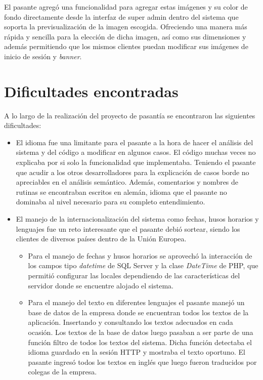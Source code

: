 	El pasante agregó una funcionalidad para agregar estas imágenes y su color de fondo directamente desde la interfaz de super admin dentro del sistema que soporta la previsualización de la imagen escogida. Ofreciendo una manera más rápida y sencilla para la elección de dicha imagen, así como sus dimensiones y además permitiendo que los mismos clientes puedan modificar sus imágenes de inicio de sesión y \emph{banner}. 


\section{Dificultades encontradas} %
\label{sec:dificultades_encontradas}

A lo largo de la realización del proyecto de pasantía se encontraron las siguientes dificultades:

\begin{itemize}
	\item El idioma fue una limitante para el pasante a la hora de hacer el análisis del sistema y del código a modificar en algunos casos. El código muchas veces no explicaba por si solo la funcionalidad que implementaba. Teniendo el pasante que acudir a los otros desarrolladores para la explicación de casos borde no apreciables en el análisis semántico. Además, comentarios y nombres de rutinas se encontraban escritos en alemán, idioma que el pasante no dominaba al nivel necesario para su completo entendimiento.

	\item El manejo de la internacionalización del sistema como fechas, husos horarios y lenguajes fue un reto interesante que el pasante debió sortear, siendo los clientes de diversos países dentro de la Unión Europea. 
	
	\begin{itemize}
		\item Para el manejo de fechas y husos horarios se aprovechó la interacción de los campos tipo \emph{datetime} de SQL Server y la clase \emph{DateTime} de PHP, que permitió configurar las locales dependiendo de las características del servidor donde se encuentre alojado el sistema.

		\item Para el manejo del texto en diferentes lenguajes el pasante manejó un base de datos de la empresa donde se encuentran todos los textos de la aplicación. Insertando y consultando los textos adecuados en cada ocasión. Los textos de la base de datos luego pasaban a ser parte de una función filtro de todos los textos del sistema. Dicha función detectaba el idioma guardado en la sesión HTTP y mostraba el texto oportuno. El pasante ingresó todos los textos en inglés que luego fueron traducidos por colegas de la empresa.
	\end{itemize}

\end{itemize}




